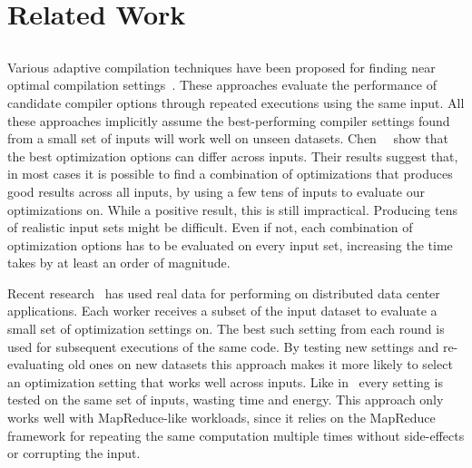 \section{Related Work}\label{sec:relatedwork}

\subsection{{\IterComp}}
Various adaptive compilation techniques have been proposed for finding near optimal compilation
settings~\cite{agakov06,kulkarni04,stephenson03}. These approaches evaluate the performance of candidate compiler options through repeated
executions using the same input. All these approaches implicitly assume the best-performing compiler settings found from a small set of
inputs will work well on unseen datasets. Chen~\etal~\cite{chen10,chen12a} show that the best optimization options can differ across
inputs. Their results suggest that, in most cases it is possible to find a combination of optimizations that produces good results across
all inputs, by using a few tens of inputs to evaluate our optimizations on. While a positive result, this is still impractical. Producing
tens of realistic input sets might be difficult. Even if not, each combination of optimization options has to be evaluated on every input
set, increasing the time \itercomp takes by at least an order of magnitude.

Recent research~\cite{chen12b,fang15} has used real data for performing {\itercomp} on distributed data center applications. Each
worker receives a subset of the input dataset to evaluate a small set of optimization settings on. The best such setting from each round
is used for subsequent executions of the same code. By testing new settings and re-evaluating old ones on new datasets this approach makes
it more likely to select an optimization setting that works well across inputs. Like in~\cite{chen10} every setting is tested on the same
set of inputs, wasting time and energy. This approach only works well with MapReduce-like workloads, since it relies on the MapReduce
framework for repeating the same computation multiple times without side-effects or corrupting the input.

